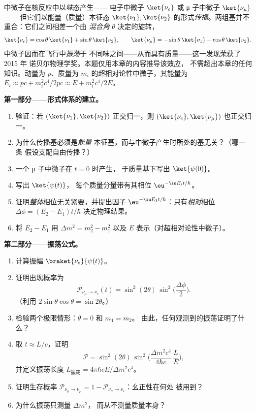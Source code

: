 \begin{problem}\label{pb:b3:quantum-formalism:1}
中微子在核反应中以\emph{味}态产生——
电子中微子 $\ket{\nu_e}$ 或 μ 子中微子 $\ket{\nu_\mu}$——
但它们以能量（质量）本征态 $\ket{\nu_1},
\ket{\nu_2}$ 的形式\emph{传播}。两组基并不重合：它们之间相差一个由
\emph{混合角} $\theta$ 决定的旋转，
\[
\ket{\nu_e} = \cos\theta\,\ket{\nu_1} + \sin\theta\,\ket{\nu_2} ,
\qquad
\ket{\nu_\mu} = -\sin\theta\,\ket{\nu_1} + \cos\theta\,\ket{\nu_2} .
\]
中微子因而在飞行中\emph{振荡}于
不同味之间——从而具有质量——这一发现荣获了 2015 年
诺贝尔物理学奖。本题仅用本章的内容推导该效应，
不需超出本章的任何知识。动量为 $p$、质量为
$m_i$ 的超相对论性中微子，其能量为 $E_i \approx pc + m_i^2c^4/2pc \approx E +
m_i^2c^4/2E$。

\medskip\noindent\textbf{第一部分——形式体系的建立。}
\begin{enumerate}
  \item 验证：若 $(\ket{\nu_1}, \ket{\nu_2})$ 正交归一，则
        $(\ket{\nu_e}, \ket{\nu_\mu})$ 也正交归一。
  \item 为什么传播基必须是\emph{能量}
        本征基，而与中微子产生时所处的基无关？（哪一条
        假设支配自由传播？）
  \item 一个 μ 子中微子在 $t = 0$ 时产生，
        于质量基下写出 $\ket{\psi(0)}$。
  \item 写出 $\ket{\psi(t)}$，
        每个质量分量带有其相位 $\eu^{-\iu E_it/\hbar}$。
  \item 证明\emph{整体}相位无关紧要，并提出因子
        $\eu^{-\iu E_1t/\hbar}$：只有\emph{相对}相位
        $\Delta\phi = (E_2 - E_1)t/\hbar$ 决定物理结果。
  \item 将 $E_2 - E_1$ 用 $\Delta m^2 = m_2^2 - m_1^2$
        以及 $E$ 表示（对超相对论性中微子）。
\end{enumerate}

\medskip\noindent\textbf{第二部分——振荡公式。}
\begin{enumerate}[resume]
  \item 计算振幅 $\braket{\nu_e}{\psi(t)}$。
  \item 证明出现概率为
        \[
        \mathcal P_{\nu_\mu \to \nu_e}(t) =
        \sin^2(2\theta)\,\sin^2\Big(\frac{\Delta\phi}{2}\Big) .
        \]
        （利用 $2\sin\theta\cos\theta = \sin2\theta$。）
  \item 检验两个极限情形：$\theta = 0$ 和 $m_1 = m_2$。
        由此，任何观测到的振荡证明了什么？
  \item 取 $t \approx L/c$，证明
        \[
        \mathcal P = \sin^2(2\theta)\,
        \sin^2\Big(\frac{\Delta m^2c^4}{4\hbar c}\,\frac{L}{E}\Big) ,
        \]
        并定义振荡长度 $L_{\text{振荡}} =
        4\pi\hbar cE/\Delta m^2c^4$。
  \item 证明生存概率 $\mathcal P_{\nu_\mu \to
        \nu_\mu} = 1 - \mathcal P_{\nu_\mu\to\nu_e}$：幺正性在何处
        被用到？
  \item 为什么振荡只测量 $\Delta m^2$，
        而从不测量质量本身？
\end{enumerate}


\end{problem}
